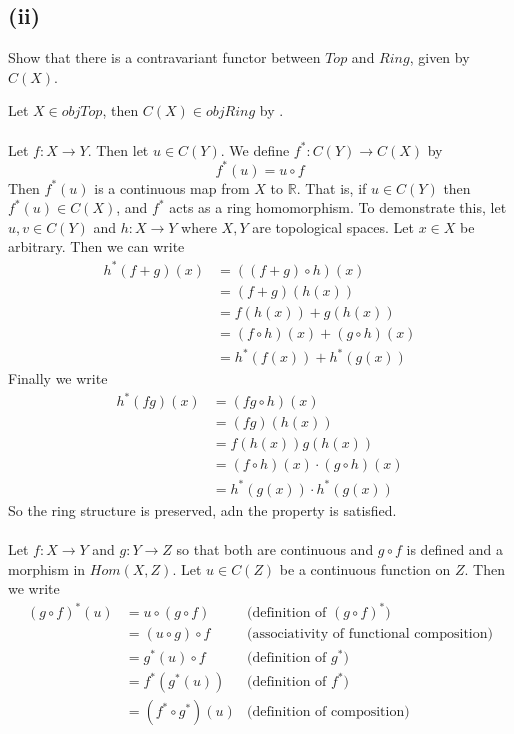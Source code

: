 \documentclass{article}
\theoremstyle{definition}
\begin{document}
    \subsection*{(ii)}
        \begin{mdframed}[]
            Show that there is a contravariant functor between $Top$ and $Ring$, given by $C(X)$.
        \end{mdframed}
         Let $X \in objTop$, then $C(X) \in objRing$ by . \\\\
         Let $f : X \rightarrow Y$.
        Then let $u \in C(Y)$. We define $f^* : C(Y) \rightarrow C(X)$ by
        \[
            f^*(u) = u \circ f
        \]
        Then $f^*(u)$ is a continuous map from $X$ to $\mathbb{R}$. That is, if $u \in C(Y)$ then $f^*(u) \in C(X)$,
        and $f^*$ acts as a ring homomorphism. 
        To demonstrate this, let $u,v \in C(Y)$ and $h : X \rightarrow Y$ where $X,Y$ are topological spaces.
        Let $x\in X$ be arbitrary. Then we can write 
        \begin{align}
            h^*(f + g)(x) &= ((f + g) \circ h)(x) \\
            &= (f + g)(h(x)) \\
            &= f(h(x)) + g(h(x)) \\
            &= (f \circ h)(x) + (g \circ h)(x) \\
            &= h^*(f(x)) + h^*(g(x))
        \end{align}
        Finally we write
        \begin{align}
            h^*(fg)(x) &= (fg \circ h)(x)\\
            &= (fg)(h(x)) \\
            &= f(h(x))g(h(x)) \\
            &= (f\circ h)(x) \cdot (g \circ h)(x) \\
            &= h^*(g(x)) \cdot h^*(g(x))
        \end{align}
        So the ring structure is preserved, adn the property is satisfied.
        \\\\
         Let $f:X \rightarrow Y$ and $g: Y \rightarrow Z$ so that both are continuous and
         $g \circ f$ is defined and a morphism in $Hom(X,Z)$. Let $u \in C(Z)$ be a continuous function on $Z$.
        Then we write 
        \begin{align}
            (g \circ f)^*(u) &= u \circ (g \circ f) & \text{(definition of $(g \circ f)^*$)}\\
            &= (u \circ g) \circ f  & \text{(associativity of functional composition)}\\
            &= g^*(u) \circ f  & \text{(definition of $g^*$)} \\
            &=f^*(g^*(u)) & \text{(definition of $f^*$)}\\
            &=(f^* \circ g^*)(u) & \text{(definition of composition)}
        \end{align}\\
\end{document}
